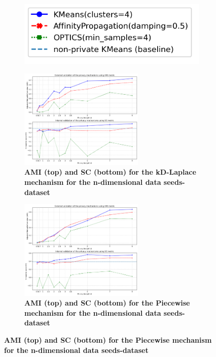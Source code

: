 \begin{figure}[H]
    \centering
    \begin{subfigure}{0.30\textwidth}
        \includegraphics[width=\textwidth]{Results/2d-laplace/seeds-dataset/legend.png}
    \end{subfigure}
    \begin{subfigure}{1\textwidth}
        \caption{\textbf{AMI (top) and SC (bottom) for the kD-Laplace mechanism for the n-dimensional data seeds-dataset}}
        \centering
        \includegraphics[width=0.65\textwidth]{Results/kd-laplace/kd-Laplace/seeds-dataset/ami-and-sc_8_dimensions.png}
        \centering
    \end{subfigure}
    \begin{subfigure}{1\textwidth}
        \caption{\textbf{AMI (top) and SC (bottom) for the Piecewise mechanism for the n-dimensional data seeds-dataset}}
        \centering
        \includegraphics[width=0.65\textwidth]{Results/kd-laplace/piecewise/seeds-dataset/ami-and-sc_8_dimensions.png}
    \end{subfigure}
    \label{fig:validation-seeds-dataset_comparison_nd-laplace}
\end{figure}

